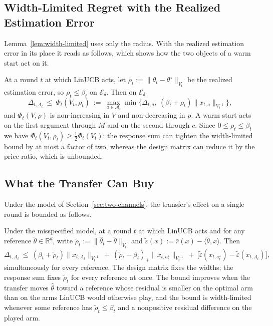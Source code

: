 \documentclass[anon]{alt2027} %
\newcommand{\R}{\mathbb{R}}
\begin{document}
\subsection{Width-Limited Regret with the Realized Estimation Error}
\label{app:two-objects}

Lemma~\ref{lem:width-limited} uses only the radius. With the realized
estimation error in its place it reads as follows, which shows how the two
objects of a warm start act on it.

\begin{proposition}
\label{prop:two-channel}
At a round $t$ at which LinUCB acts, let
$\rho_t:=\|\widehat\theta_t-\theta^\star\|_{V_t}$ be the realized estimation
error, so $\rho_t\le\beta_t$ on $\mathcal E_\delta$. Then on $\mathcal E_\delta$
\begin{equation}
\label{eq:phi-two}
\Delta_{t,A_t}\ \le\ \Phi_t(V_t,\rho_t)\ :=\
\max_{a\in\mathcal A_t}\min\bigl\{\Delta_{t,a},\ (\beta_t+\rho_t)\|x_{t,a}\|_{V_t^{-1}}\bigr\},
\end{equation}
and $\Phi_t(V,\rho)$ is non-increasing in $V$ and non-decreasing in $\rho$. A warm start acts
on the first argument through $M$ and on the second through $c$. Since
$0\le\rho_t\le\beta_t$ we have $\Phi_t(V_t,\rho_t)\ge\tfrac12\Phi_t(V_t)$: the
response sum can tighten the width-limited bound by at most a factor of two,
whereas the design matrix can reduce it by the price ratio, which is unbounded.
\end{proposition}

\subsection{What the Transfer Can Buy}
\label{app:transfer-regret}

Under the model of Section~\ref{sec:two-channels}, the transfer's effect on a
single round is bounded as follows.

\begin{proposition}
\label{prop:transfer-regret}
Under the misspecified model, at a round $t$ at which LinUCB acts and for any
reference $\widetilde\theta\in\R^d$, write
$\widetilde\rho_t:=\|\widehat\theta_t-\widetilde\theta\|_{V_t}$ and
$\widetilde\varepsilon(x):=\bar r(x)-\langle\widetilde\theta,x\rangle$. Then
\[
\Delta_{t,A_t}\ \le\ (\beta_t+\widetilde\rho_t)\|x_{t,A_t}\|_{V_t^{-1}}
\ +\ (\widetilde\rho_t-\beta_t)_+\|x_{t,a^\star_t}\|_{V_t^{-1}}
\ +\ \bigl[\widetilde\varepsilon(x_{t,a^\star_t})-\widetilde\varepsilon(x_{t,A_t})\bigr],
\]
simultaneously for every reference. The design matrix fixes the widths; the
response sum fixes $\widetilde\rho_t$ for every reference at once. The
bound improves when the transfer moves $\widehat\theta$ toward a reference whose
residual is smaller on the optimal arm than on the arms LinUCB would otherwise
play, and the bound is width-limited whenever some reference has
$\widetilde\rho_t\le\beta_t$ and a nonpositive residual difference on the
played arm.
\end{proposition}
\end{document}
